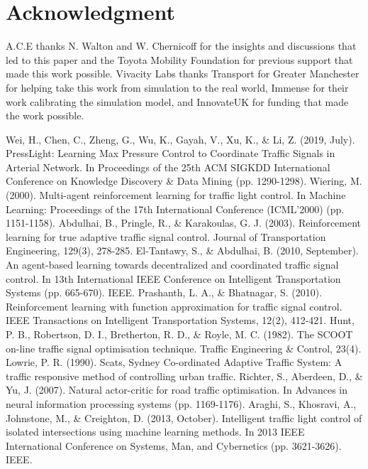 \documentclass[conference]{IEEEtran}
\begin{document}
\addtolength{\textheight}{-12.5cm} 

\section*{Acknowledgment}

A.C.E thanks N. Walton and W. Chernicoff for the insights and discussions that led to this paper and the Toyota Mobility Foundation for previous support that made this work possible. Vivacity Labs thanks Transport for Greater Manchester for helping take this work from simulation to the real world, Immense for their work calibrating the simulation model, and InnovateUK for funding that made the work possible.


\begin{thebibliography}{00}
 Wei, H., Chen, C., Zheng, G., Wu, K., Gayah, V., Xu, K., \& Li, Z. (2019, July). PressLight: Learning Max Pressure Control to Coordinate Traffic Signals in Arterial Network. In Proceedings of the 25th ACM SIGKDD International Conference on Knowledge Discovery \& Data Mining (pp. 1290-1298).
 Wiering, M. (2000). Multi-agent reinforcement learning for traffic light control. In Machine Learning: Proceedings of the 17th International Conference (ICML'2000) (pp. 1151-1158).
 Abdulhai, B., Pringle, R., \& Karakoulas, G. J. (2003). Reinforcement learning for true adaptive traffic signal control. Journal of Transportation Engineering, 129(3), 278-285.
 El-Tantawy, S., \& Abdulhai, B. (2010, September). An agent-based learning towards decentralized and coordinated traffic signal control. In 13th International IEEE Conference on Intelligent Transportation Systems (pp. 665-670). IEEE.
 Prashanth, L. A., \& Bhatnagar, S. (2010). Reinforcement learning with function approximation for traffic signal control. IEEE Transactions on Intelligent Transportation Systems, 12(2), 412-421.
 Hunt, P. B., Robertson, D. I., Bretherton, R. D., \& Royle, M. C. (1982). The SCOOT on-line traffic signal optimisation technique. Traffic Engineering \& Control, 23(4).
 Lowrie, P. R. (1990). Scats, Sydney Co-ordinated Adaptive Traffic System: A traffic responsive method of controlling urban traffic.
 Richter, S., Aberdeen, D., \& Yu, J. (2007). Natural actor-critic for road traffic optimisation. In Advances in neural information processing systems (pp. 1169-1176).
 Araghi, S., Khosravi, A., Johnstone, M., \& Creighton, D. (2013, October). Intelligent traffic light control of isolated intersections using machine learning methods. In 2013 IEEE International Conference on Systems, Man, and Cybernetics (pp. 3621-3626). IEEE.

\end{thebibliography}
\end{document}
